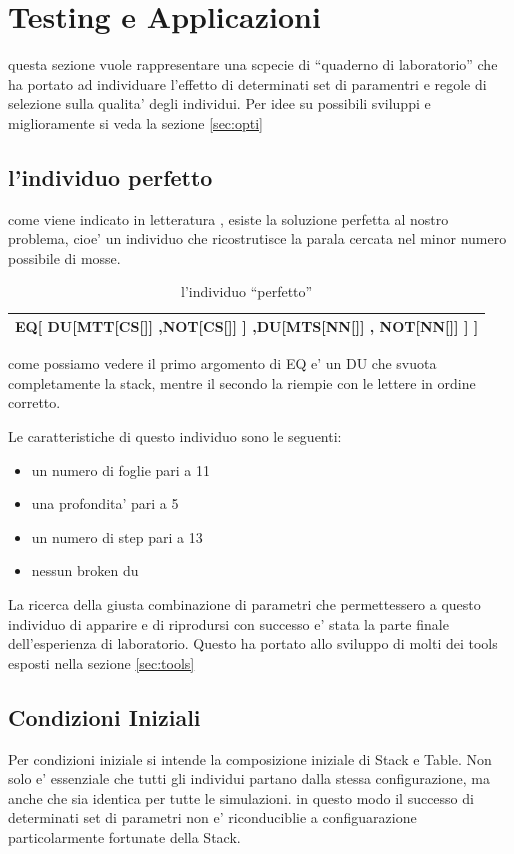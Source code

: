 \documentclass[12pt, a4paper]{article}
\begin{document}
\section{Testing e Applicazioni}
\label{sec:exp}
questa sezione vuole rappresentare una scpecie di ``quaderno di laboratorio'' che ha portato ad individuare l'effetto di determinati set di paramentri e regole di selezione sulla qualita' degli individui.
Per idee su possibili sviluppi e miglioramente si veda la sezione \ref{sec:opti}

\subsection{l'individuo perfetto}
come viene indicato in letteratura \cite{mitchell}, esiste la soluzione perfetta al nostro problema, cioe' un individuo che ricostrutisce la parala cercata nel minor numero possibile di mosse.
\begin{table}[h]
\begin{tabular}{|c|}
\hline
EQ[ DU[MTT[CS[]] ,NOT[CS[]]  ] ,DU[MTS[NN[]] , NOT[NN[]] ]  ]\\
\hline
\end{tabular}
\caption{l'individuo ``perfetto''}
\label{table:perf}
\end{table}

come possiamo vedere il primo argomento di EQ e' un DU che svuota completamente la stack, mentre il secondo la riempie con le lettere in ordine corretto.

Le caratteristiche di questo individuo sono le seguenti:
\begin{itemize}
\item un numero di foglie pari a 11
\item una profondita' pari a 5
\item un numero di step pari a 13
\item nessun broken du
\label{item:perf}
\end{itemize}

La ricerca della giusta combinazione di parametri che permettessero a questo individuo di apparire e di riprodursi con successo e' stata la parte finale dell'esperienza di laboratorio.
Questo ha portato allo sviluppo di molti dei tools esposti nella sezione \ref{sec:tools}

\subsection{Condizioni Iniziali}
Per condizioni iniziale si intende la composizione iniziale di Stack e Table. Non solo e' essenziale che tutti gli individui partano dalla stessa configurazione, ma anche che sia identica per tutte le simulazioni. in questo modo il successo di determinati set di parametri non e' riconduciblie a configuarazione particolarmente fortunate della Stack.
\end{document}
